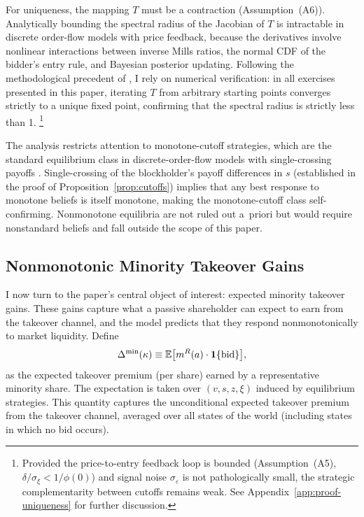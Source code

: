 \documentclass[11pt]{article}
\newcommand{\E}{\mathbb{E}}
\newcommand{\1}{\mathbf{1}}
\begin{document}
For uniqueness, the mapping $T$ must be a contraction (Assumption~\textup{(A6)}). Analytically bounding the spectral radius of the Jacobian of $T$ is intractable in discrete order-flow models with price feedback, because the derivatives involve nonlinear interactions between inverse Mills ratios, the normal CDF of the bidder's entry rule, and Bayesian posterior updating. Following the methodological precedent of \citet{EdmansGoldsteinJiang2015}, I rely on numerical verification: in all exercises presented in this paper, iterating $T$ from arbitrary starting points converges strictly to a unique fixed point, confirming that the spectral radius is strictly less than 1.%
\footnote{Provided the price-to-entry feedback loop is bounded (Assumption~\textup{(A5)}, $\delta/\sigma_\xi < 1/\phi(0)$) and signal noise $\sigma_\varepsilon$ is not pathologically small, the strategic complementarity between cutoffs remains weak. See Appendix~\ref{app:proof-uniqueness} for further discussion.}

The analysis restricts attention to monotone-cutoff strategies, which are the standard equilibrium class in discrete-order-flow models with single-crossing payoffs \citep{EdmansGoldsteinJiang2015,EdmansGoldsteinJiang2012}. Single-crossing of the blockholder's payoff differences in $s$ (established in the proof of Proposition~\ref{prop:cutoffs}) implies that any best response to monotone beliefs is itself monotone, making the monotone-cutoff class self-confirming. Nonmonotone equilibria are not ruled out a~priori but would require nonstandard beliefs and fall outside the scope of this paper.

%
\subsection{Nonmonotonic Minority Takeover Gains}
%

I now turn to the paper's central object of interest: expected minority takeover gains. These gains capture what a passive shareholder can expect to earn from the takeover channel, and the model predicts that they respond nonmonotonically to market liquidity. Define
\begin{equation}
\Delta^{\min}(\kappa) \equiv \E\big[m^{R}(a) \cdot \1\{\textup{bid}\}\big],
\label{eq:minority}
\end{equation}
as the expected takeover premium (per share) earned by a representative minority share. The expectation is taken over $(v,s,z,\xi)$ induced by equilibrium strategies. This quantity captures the unconditional expected takeover premium from the takeover channel, averaged over all states of the world (including states in which no bid occurs).
\end{document}
